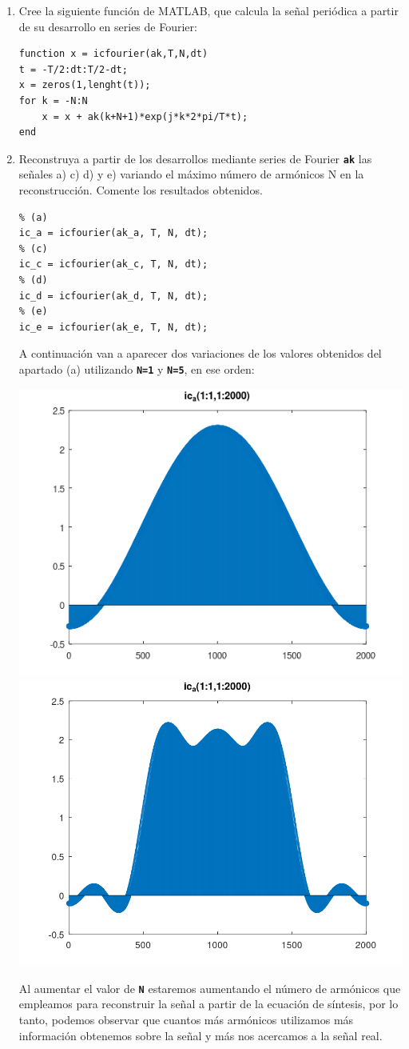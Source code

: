 \documentclass{article}
\newcommand{\code}[1]{\texttt{\textbf{#1}}}
\begin{document}
\begin{enumerate}[leftmargin=*]
\item Cree la siguiente función de MATLAB, que calcula la señal periódica a partir de su desarrollo en series de Fourier:

\begin{lstlisting}
function x = icfourier(ak,T,N,dt)
t = -T/2:dt:T/2-dt;
x = zeros(1,lenght(t));
for k = -N:N
    x = x + ak(k+N+1)*exp(j*k*2*pi/T*t);
end
\end{lstlisting}
\item Reconstruya a partir de los desarrollos mediante series de Fourier \code{ak} las señales a) c) d) y e) variando el máximo número de armónicos N en la reconstrucción. Comente los resultados obtenidos.

\begin{lstlisting}
% (a)
ic_a = icfourier(ak_a, T, N, dt);
% (c)
ic_c = icfourier(ak_c, T, N, dt);
% (d)
ic_d = icfourier(ak_d, T, N, dt);
% (e)
ic_e = icfourier(ak_e, T, N, dt);
\end{lstlisting}

A continuación van a aparecer dos variaciones de los valores obtenidos del apartado (a) utilizando \code{N=1} y \code{N=5}, en ese orden:

\begin{center}
\includegraphics[width=0.45\linewidth]{Imágenes/prueba_n1}
\includegraphics[width=0.45\linewidth]{Imágenes/prueba_n5}
\end{center}

Al aumentar el valor de \code{N} estaremos aumentando el número de armónicos que empleamos para reconstruir la señal a partir de la ecuación de síntesis, por lo tanto, podemos observar que cuantos más armónicos utilizamos más información obtenemos sobre la señal y más nos acercamos a la señal real.


\end{enumerate}
\end{document}
